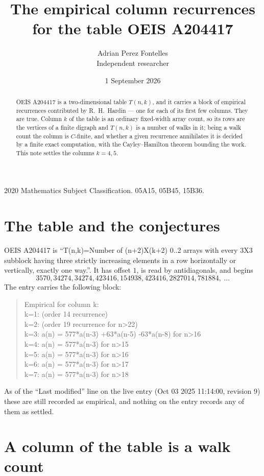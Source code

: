 \documentclass[11pt,a4paper]{article}
\title{The empirical column recurrences for the table OEIS A204417}
\author{Adrian Perez Fontelles\\ \small Independent researcher}
\date{1 September 2026}
\theoremstyle{plain}
\theoremstyle{definition}
\begin{document}
\maketitle

\begin{abstract}
OEIS A204417 is a two-dimensional table $T(n,k)$, and it carries a block of empirical
recurrences contributed by R.~H.~Hardin --- one for each of its first few columns. They are
true. Column $k$ of the table is an ordinary fixed-width array count, so its rows are the
vertices of a finite digraph and $T(n,k)$ is a number of walks in it; being a walk count the
column is $C$-finite, and whether a given recurrence annihilates it is decided by a finite
exact computation, with the Cayley--Hamilton theorem bounding the work. This note settles the columns $k=4, 5$.
\end{abstract}

\noindent\small 2020 Mathematics Subject Classification. 05A15, 05B45, 15B36.\normalsize

\section{The table and the conjectures}

OEIS A204417 is ``T(n,k)=Number of (n+2)X(k+2) 0..2 arrays with every 3X3 subblock having three strictly increasing elements in a row horizontally or vertically, exactly one way.''. It has offset $1$, is
read by antidiagonals, and begins
\[
3570, 34274, 34274, 423416, 154938, 423416, 2827014, 781884,\ \dots
\]
The entry carries the following block:
\begin{quote}\small
Empirical for column k:\\
k=1: (order 14 recurrence)\\
k=2: (order 19 recurrence for n>22)\\
k=3: a(n) = 577*a(n-3) +63*a(n-5) -63*a(n-8) for n>16\\
k=4: a(n) = 577*a(n-3) for n>15\\
k=5: a(n) = 577*a(n-3) for n>16\\
k=6: a(n) = 577*a(n-3) for n>17\\
k=7: a(n) = 577*a(n-3) for n>18\\
\end{quote}
As of the ``Last modified'' line on the live entry (Oct 03 2025 11:14:00, revision 9) these are still
recorded as empirical, and nothing on the entry records any of them as settled.

\section{A column of the table is a walk count}
\end{document}
